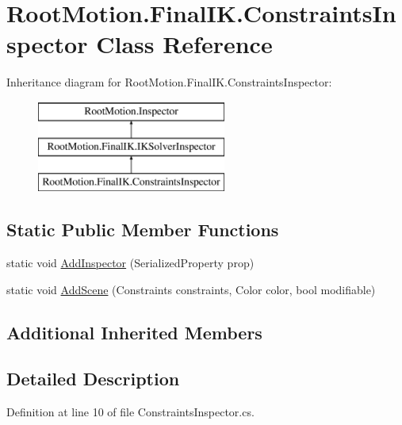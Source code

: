 \hypertarget{class_root_motion_1_1_final_i_k_1_1_constraints_inspector}{}\section{Root\+Motion.\+Final\+I\+K.\+Constraints\+Inspector Class Reference}
\label{class_root_motion_1_1_final_i_k_1_1_constraints_inspector}
Inheritance diagram for Root\+Motion.\+Final\+I\+K.\+Constraints\+Inspector\+:\begin{figure}[H]
\begin{center}
\leavevmode
\includegraphics[height=3.000000cm]{class_root_motion_1_1_final_i_k_1_1_constraints_inspector}
\end{center}
\end{figure}
\subsection*{Static Public Member Functions}
\begin{DoxyCompactItemize}
\item 
static void \mbox{\hyperlink{class_root_motion_1_1_final_i_k_1_1_constraints_inspector_a02d18a1e6cf7fb0e15afa40aea3482f2}{Add\+Inspector}} (Serialized\+Property prop)
\item 
static void \mbox{\hyperlink{class_root_motion_1_1_final_i_k_1_1_constraints_inspector_a5da94528055b76f988008e744a1b3ea4}{Add\+Scene}} (Constraints constraints, Color color, bool modifiable)
\end{DoxyCompactItemize}
\subsection*{Additional Inherited Members}


\subsection{Detailed Description}


Definition at line 10 of file Constraints\+Inspector.\+cs.



